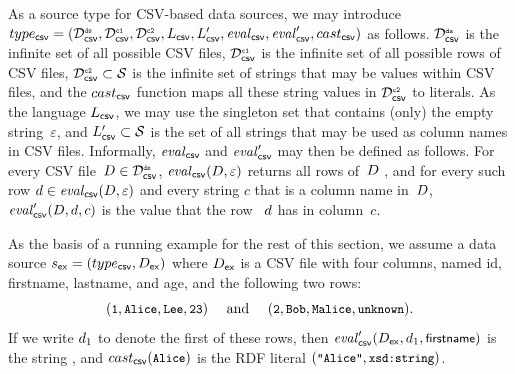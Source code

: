 \begin{example}
	\label{ex:source_type_csv}
	As a
	source
	type for CSV-based data sources, we may
	introduce
	$type_{\mathsf{csv}} = (\mathcal{D}^\texttt{\tiny ds}_{\mathsf{csv}}, \mathcal{D}^\texttt{\tiny c1}_{\mathsf{csv}}, \mathcal{D}^\texttt{\tiny c2}_{\mathsf{csv}}, L_{\mathsf{csv}}, L_{\mathsf{csv}}', \mathit{eval}_{\mathsf{csv}}, \mathit{eval}_{\mathsf{csv}}', cast_{\mathsf{csv}})$ as follows.
	$\mathcal{D}^\texttt{\tiny ds}_{\mathsf{csv}}$ is the infinite set of all possible CSV files,
	$\mathcal{D}^\texttt{\tiny c1}_{\mathsf{csv}}$ is the infinite set of all possible rows of CSV files,
	$\mathcal{D}^\texttt{\tiny c2}_{\mathsf{csv}} \subset \mathcal{S}$ is the infinite set of strings that may be values within CSV files, and
	the $cast_{\mathsf{csv}}$ function maps all these string values
	in $\mathcal{D}^\texttt{\tiny c2}_{\mathsf{csv}}$
	to  literals.
	As the language $L_{\mathsf{csv}}$, we may use the singleton set that contains (only) the empty string~$\varepsilon$, and $L'_{\mathsf{csv}} \subset \mathcal{S}$ is the set of all strings that may be used as column names in CSV files. Informally, $\mathit{eval}_{\mathsf{csv}}$ and $\mathit{eval}_{\mathsf{csv}}'$ may then be defined as follows. For
	every CSV file~$D \in \mathcal{D}^\texttt{\tiny ds}_{\mathsf{csv}}$, $\mathit{eval}_{\mathsf{csv}}(D,\varepsilon)$ returns all rows of~$D$%
	, and for every such row
	$d \in \mathit{eval}_{\mathsf{csv}}(D,\varepsilon)$
	and every string $c$ that is a column name in~$D$, $\mathit{eval}_{\mathsf{csv}}'(D,d,c)$ is the value that
	the row~%
	$d$ has in column~$c$.
\end{example}

\vspace{-3mm} %

\begin{example}
	\label{ex:running_ex_source_type}
	As the basis of a running example for the rest of this section, we assume a
	data source $s_\mathsf{ex} = (type_{\mathsf{csv}},D_\mathsf{ex})$ where $D_\mathsf{ex}$ is a CSV file with four columns, named \textsf{\small id}, \textsf{\small firstname},
	\textsf{\small lastname}, and \textsf{\small age}, and the following two rows:%
%
\vspace{-2mm} %
%
	\begin{equation*}
        (\ttl{1}, \ttl{Alice}, \ttl{Lee}, \ttl{23}) \quad \text{ and } \quad (\ttl{2}, \ttl{Bob}, \ttl{Malice}, \ttl{unknown})
        .
\vspace{-2mm} %
	\end{equation*}
%
%
	If we write $d_1$ to denote the first of these rows,
		then
	$\mathit{eval}_{\mathsf{csv}}'(D_\mathsf{ex}, d_1, \textsf{\small firstname})$ is the string
	, and $cast_{\mathsf{csv}}(\texttt{\small Alice})$ is the RDF literal $(\texttt{\small "Alice"}, \texttt{\small xsd:string})$. 
\end{example}

